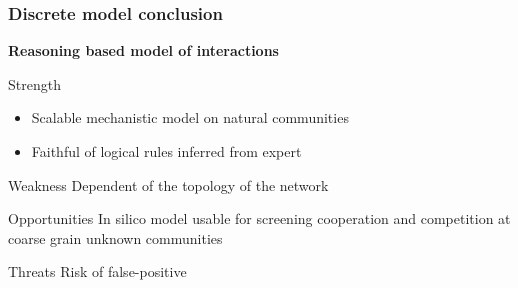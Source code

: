 \documentclass[8pt,usenames,dvipsnames]{beamer}
\begin{document}
\begin{frame}
\frametitle{Discrete model conclusion}
\centering
\textbf{\huge Reasoning based model of interactions}


\begin{minipage}{0.45\textwidth}
\vspace{0.3cm}
\begin{block}{Strength}
\begin{itemize}
\item Scalable mechanistic model on natural communities
\item Faithful of logical rules inferred from expert
\end{itemize}
\end{block} %
\end{minipage}\hfill
\hspace{0.5cm}
\hfill
\begin{minipage}{0.45\textwidth}
\begin{block}{Weakness}
Dependent of the topology of the network
\end{block}
\end{minipage}


\begin{minipage}{0.45\textwidth}
\begin{block}{Opportunities}
In silico model usable for screening cooperation and competition at coarse grain unknown communities
\end{block} %
\end{minipage}\hfill
\hspace{0.5cm}
\hfill
\begin{minipage}{0.45\textwidth}
\begin{block}{Threats}
Risk of false-positive
\end{block}
\end{minipage}


\end{frame}
\end{document}
